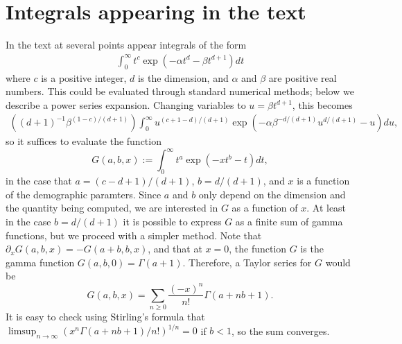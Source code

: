 \documentclass{article}
\begin{document}


\appendix

\section{Integrals appearing in the text}
    \label{apx:integrals}

In the text at several points appear integrals of the form
\begin{align}
  \int_0^\infty t^c \exp \left( - \alpha t^d - \beta t^{d+1} \right) dt 
\end{align}
where $c$ is a positive integer, $d$ is the dimension, and $\alpha$ and $\beta$ are positive real numbers.
This could be evaluated through standard numerical methods; below we describe a power series expansion.
Changing variables to $u = \beta t^{d+1}$, this becomes
\begin{align}
    \left( (d+1)^{-1} \beta^{ (1-c)/(d+1) } \right) \int_0^\infty u^{(c+1-d)/(d+1)} \exp\left( - \alpha \beta^{-d/(d+1)} u^{d/(d+1)} - u \right) du ,
\end{align}
so it suffices to evaluate the function
\begin{equation}
    G(a,b,x) := \int_0^\infty  t^a \exp\left( -x t^b - t \right) dt ,
\end{equation}
in the case that $a=(c-d+1)/(d+1)$, $b=d/(d+1)$, and $x$ is a function of the demographic paramters.
Since $a$ and $b$ only depend on the dimension and the quantity being computed,
we are interested in $G$ as a function of $x$.
At least in the case $b=d/(d+1)$ it is possible to express $G$ as a finite sum of gamma functions,
but we proceed with a simpler method.
Note that $\partial_x G(a,b,x) = -G(a+b,b,x)$,
and that at $x=0$, the function $G$ is the gamma function $G(a,b,0) = \Gamma(a+1)$.
Therefore, a Taylor series for $G$ would be
\[
    G(a,b,x) = \sum_{n \ge 0} \frac{(-x)^n}{n!} \Gamma(a+nb+1) .
\]
It is easy to check using Stirling's formula that $\limsup_{n \to \infty} ( x^n \Gamma(a+nb+1)/n! )^{1/n} = 0$
if $b<1$, so the sum converges.
\end{document}
